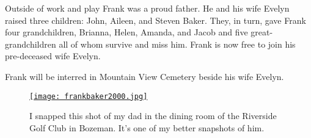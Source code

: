Outside of work and play Frank was a proud father. He and his wife
Evelyn raised three children: John, Aileen, and Steven Baker. They, in
turn, gave Frank four grandchildren, Brianna, Helen, Amanda, and Jacob
and five great-grandchildren all of whom survive and miss him. Frank is
now free to join his pre-deceased wife Evelyn.

Frank will be interred in Mountain View Cemetery beside his wife Evelyn.

\begin{SCfigure}[50]
\centering
\href{https://conceptcontrol.smugmug.com/People/The-Way-We-Were/i-7mCwg3D/A}{\texttt{[image: frankbaker2000.jpg]}}
\caption{I snapped this shot of my dad in the dining room of the
Riverside Golf Club in Bozeman. It's one of my better snapshots of him.}
\label{fig:7074x3}
\end{SCfigure}



%
 
